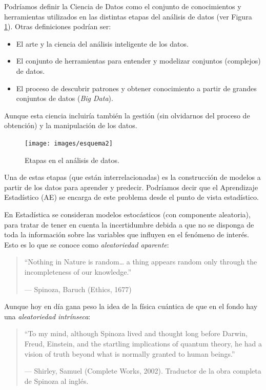 \documentclass[
]{book}
\theoremstyle{break}
\theoremstyle{nonumberplain}
\begin{document}
Podríamos definir la Ciencia de Datos como el conjunto de conocimientos y herramientas utilizados en las distintas etapas del análisis de datos (ver Figura \ref{fig:esquema}).
Otras definiciones podrían ser:

\begin{itemize}
\item
  El arte y la ciencia del análisis inteligente de los datos.
\item
  El conjunto de herramientas para entender y modelizar conjuntos (complejos) de datos.
\item
  El proceso de descubrir patrones y obtener conocimiento a partir de grandes conjuntos de datos (\emph{Big Data}).
\end{itemize}

Aunque esta ciencia incluiría también la gestión (sin olvidarnos del proceso de obtención) y la manipulación de los datos.

\begin{figure}[!htb]

{\centering \texttt{[image: images/esquema2]} 

}

\caption{Etapas en el análisis de datos.}\label{fig:esquema}
\end{figure}

Una de estas etapas (que están interrelacionadas) es la construcción de modelos a partir de los datos para aprender y predecir.
Podríamos decir que el Aprendizaje Estadístico (AE) se encarga de este problema desde el punto de vista estadístico.

En Estadística se consideran modelos estocásticos (con componente aleatoria), para tratar de tener en cuenta la incertidumbre debida a que no se disponga de toda la información sobre las variables que influyen en el fenómeno de interés.
Esto es lo que se conoce como \emph{aleatoriedad aparente}:

\begin{quote}
``Nothing in Nature is random\ldots{} a thing appears random only through the incompleteness of our knowledge.''

--- Spinoza, Baruch (Ethics, 1677)
\end{quote}

Aunque hoy en día gana peso la idea de la física cuántica de que en el fondo hay una \emph{aleatoriedad intrínseca}:

\begin{quote}
``To my mind, although Spinoza lived and thought long before Darwin, Freud, Einstein, and the startling implications of quantum theory, he had a vision of truth beyond what is normally granted to human beings.''

--- Shirley, Samuel (Complete Works, 2002).
Traductor de la obra completa de Spinoza al inglés.
\end{quote}
\end{document}
